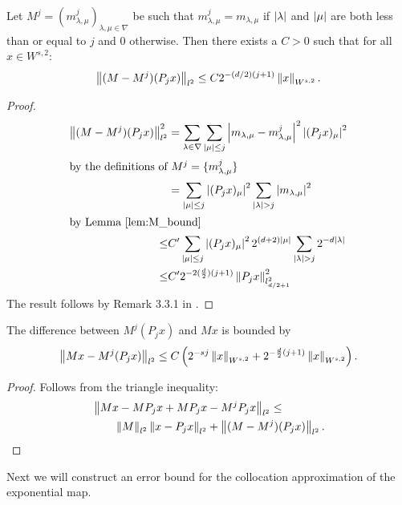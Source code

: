 \begin{lemma} 
	Let $M^j=(m^j_{\lambda,\mu})_{\lambda,\mu \in \nabla}$ be such that $m^j_{\lambda,\mu} = m_{\lambda,\mu}$ if ${\lvert\lambda\rvert}$ and ${\lvert\mu\rvert}$ are both less than or equal to $j$ and $0$ otherwise. Then there exists a $C > 0$ such that for all $x \in W^{s,2}$:
	\begin{equation}
		\left\| (M-M^j)(P_jx) \right\|_{l^2} \leq C2^{-(d/2)(j+1)} \left\| x \right\|_{W^{s,2}}.
	\end{equation}
\end{lemma}
\begin{proof}
	\begin{align*}
		\left\| (M-M^j)(P_j x) \right\|_{l^2}^2 &= \sum_{\lambda \in \nabla} \sum_{{\lvert\mu\rvert}\leq j} \left| m_{\lambda,\mu}-m^j_{\lambda,\mu} \right|^2 \left| (P_j x)_\mu \right|^2 \\
	\intertext{by the definitions of $M^j = \{ m_{\lambda,\mu}^j \}$ }
		\qquad &= \sum_{{\lvert\mu\rvert}\leq j}\left| (P_j x)_\mu \right|^2 \sum_{{\lvert\lambda\rvert}>j}\left| m_{\lambda,\mu} \right|^2 \\
	\intertext{by Lemma \ref{lem:M_bound}}
		 \leq& C'\sum_{{\lvert\mu\rvert}\leq j}\left| (P_j x)_\mu \right|^2 2^{(d+2){\lvert\mu\rvert}}\sum_{{\lvert\lambda\rvert}>j}2^{-d{\lvert\lambda\rvert}} \\
		 \leq& C' 2^{-2(\frac{d}{2})(j+1)}\left\| P_j x \right\|^2_{l^2_{d/2+1}}
	\end{align*}
	The result follows by Remark 3.3.1 in \cite{Cohen2003}.
\end{proof}

\begin{corollary}
	The difference between $M^j (P_j x)$ and $M x$ is bounded by
	\[
		\left\| Mx - M^j(P_j x) \right\|_{l^2} \leq C \left( 2^{-sj}\left\| x \right\|_{W^{s,2}} + 2^{-\frac{d}{2}(j+1)}\left\| x \right\|_{W^{s,2}} \right).
	\]
\end{corollary}
\begin{proof}
	Follows from the triangle inequality:
	\begin{align*}
		&\left\| Mx - M P_j x + M P_j x - M^j P_j x \right\|_{l^2} \leq \\
		&\qquad \left\| M \right\|_{l^2} \left\| x - P_j x \right\|_{l^2} + \left\| (M-M^j)(P_jx) \right\|_{l^2}.
	\end{align*}
\end{proof}


Next we will construct an error bound for the collocation approximation of the exponential map.

